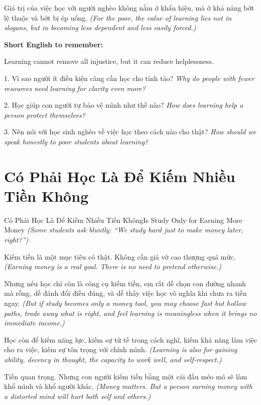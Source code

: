 \begin{baihoc}
Giá trị của việc học với người nghèo không nằm ở khẩu hiệu, mà ở khả năng bớt lệ thuộc và bớt bị ép uổng.
\textit{(For the poor, the value of learning lies not in slogans, but in becoming less dependent and less easily forced.)}
\end{baihoc}

\begin{ghinhoanh}
\textbf{Short English to remember:}

Learning cannot remove all injustice, but it can reduce helplessness.

\end{ghinhoanh}

\begin{tuhocnhanh}
1. Vì sao người ít điều kiện càng cần học cho tỉnh táo? \textit{Why do people with fewer resources need learning for clarity even more?}

2. Học giúp con người tự bảo vệ mình như thế nào? \textit{How does learning help a person protect themselves?}

3. Nên nói với học sinh nghèo về việc học theo cách nào cho thật? \textit{How should we speak honestly to poor students about learning?}
\end{tuhocnhanh}
\ngancach

\section{Có Phải Học Là Để Kiếm Nhiều Tiền Không}
\begin{truyen}{Có Phải Học Là Để Kiếm Nhiều Tiền Không}{Is Study Only for Earning More Money}
\textit{(Some students ask bluntly: “We study hard just to make money later, right?”)}

Kiếm tiền là một mục tiêu có thật. Không cần giả vờ cao thượng quá mức.
\textit{(Earning money is a real goal. There is no need to pretend otherwise.)}

Nhưng nếu học chỉ còn là công cụ kiếm tiền, em rất dễ chọn con đường nhanh mà rỗng, dễ đánh đổi điều đúng, và dễ thấy việc học vô nghĩa khi chưa ra tiền ngay.
\textit{(But if study becomes only a money tool, you may choose fast but hollow paths, trade away what is right, and feel learning is meaningless when it brings no immediate income.)}

Học còn để kiếm năng lực, kiếm sự tử tế trong cách nghĩ, kiếm khả năng làm việc cho ra việc, kiếm sự tôn trọng với chính mình.
\textit{(Learning is also for gaining ability, decency in thought, the capacity to work well, and self-respect.)}

Tiền quan trọng. Nhưng con người kiếm tiền bằng một cái đầu méo mó sẽ làm khổ mình và khổ người khác.
\textit{(Money matters. But a person earning money with a distorted mind will hurt both self and others.)}
\end{truyen}

